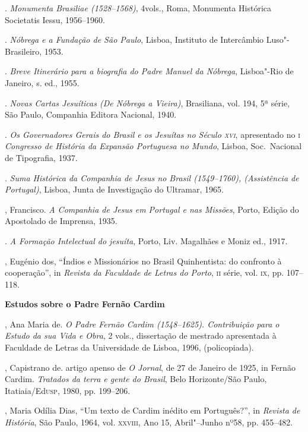\begin{bibliohedra}
\titidem. \textit{Monumenta Brasiliae (1528--1568)}, 4vols.,
Roma, Monumenta Histórica Societatis Iessu, 1956--1960.

\titidem. \textit{Nóbrega e a Fundação de São Paulo}, Lisboa,
Instituto de Intercâmbio Luso"-Brasileiro, 1953.

\titidem. \textit{Breve Itinerário para a biografia do Padre
Manuel da Nóbrega}, Lisboa"-Rio de Janeiro, s. ed., 1955. 

\titidem. \textit{Novas Cartas Jesuíticas (De Nóbrega a Vieira)}, 
Brasiliana, vol. 194, 5ª série, São Paulo, Companhia Editora Nacional, 1940.

\titidem. \textit{Os Governadores Gerais do Brasil e os Jesuítas
no Século \textsc{xvi}}, apresentado no \textsc{i} \textit{Congresso de História da
Expansão Portuguesa no Mundo}, Lisboa, Soc.~Nacional de Tipografia, 1937.

\titidem. \textit{Suma Histórica da Companhia de Jesus no Brasil
(1549--1760), (Assistência de Portugal)}, Lisboa, Junta de Investigação
do Ultramar, 1965.

, Francisco. \textit{A Companhia de Jesus em Portugal e nas
Missões}, Porto, Edição do Apostolado de Imprensa, 1935.

\titidem. \textit{A Formação Intelectual do jesuíta}, 
Porto, Liv. Magalhães e Moniz ed., 1917.

, Eugénio dos, ``Índios e Missionários no Brasil Quinhentista: do
confronto à cooperação'', in \textit{Revista da Faculdade de Letras do
Porto}, \textsc{ii} série, vol. \textsc{ix}, pp. 107--118.

\vspace*{2ex}
\scriptsize\textbf{Estudos sobre o Padre Fernão Cardim}

, Ana Maria de. \textit{O Padre Fernão Cardim (1548--1625).
Contribuição para o Estudo da sua Vida e Obra}, 2 vols., dissertação de
mestrado apresentada à Faculdade de Letras da Universidade de Lisboa, 1996, (policopiada).

, Capistrano de. artigo apenso de \textit{O Jornal}, de 27 de
Janeiro de 1925, in Fernão Cardim. \textit{Tratados da terra e gente do
Brasil}, Belo Horizonte/São Paulo, Itatiaia/Ed\textsc{usp}, 1980, pp. 199--206.

, Maria Odília Dias, ``Um texto de Cardim inédito em Português?'',
in \textit{Revista de História}, São Paulo, 1964, vol. \textsc{xxviii}, Ano 15,
Abril"--Junho nº58, pp. 455--482.


\end{bibliohedra}
